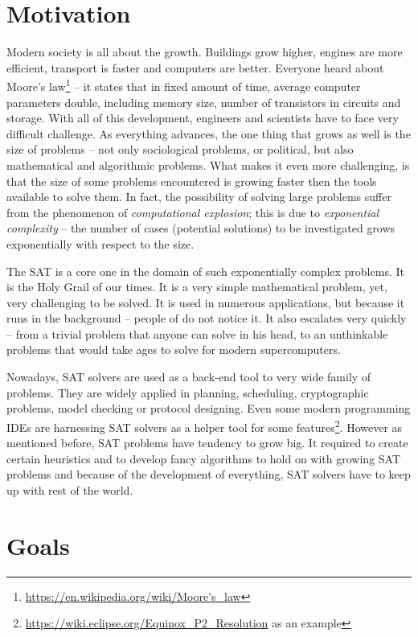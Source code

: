 \documentclass[12pt,english,pdflatex]{aghdpl}
\begin{document}
\section{Motivation}
\label{sec:motivation}

Modern society is all about the growth. Buildings grow higher, engines
are more efficient, transport is faster and computers are better. Everyone
heard about Moore's law\footnote{\url{https://en.wikipedia.org/wiki/Moore's_law}} -- it states that in fixed amount of time,
average computer parameters double, including memory size, number of transistors
in circuits and storage. With all of this development, engineers and
scientists have to face very difficult challenge. As everything advances,
the one thing that grows as well is the size of problems -- not only
sociological problems, or political, but also mathematical and algorithmic
problems. What makes it even more challenging, is that the size of
some problems encountered is growing faster then the tools available to
solve them. In fact, the possibility of solving large problems suffer from the phenomenon of \textit{computational explosion}; this is due to \textit{exponential complexity} -- the number of cases (potential solutions)  to be investigated grows exponentially with respect to the size.

The SAT is a core one in the domain of such exponentially complex problems. It is the Holy Grail of our times.
It is a very simple mathematical problem, yet, very challenging to
be solved. It is used in numerous applications, but because it runs
in the background -- people of do not  notice it. It also escalates very quickly
-- from a trivial problem that anyone can solve in his head, to an
unthinkable problems that would take ages to solve for modern supercomputers.

Nowadays, SAT solvers are used as a back-end tool to very wide family of problems.
They are widely applied in planning, scheduling, cryptographic problems,
model checking or protocol designing. Even some modern programming IDEs are harnessing
SAT solvers as a helper tool for some features\footnote{\url{https://wiki.eclipse.org/Equinox_P2_Resolution} as an example}. However as
mentioned before, SAT problems have tendency to grow big. It required
to create certain heuristics and to develop fancy algorithms to hold
on with growing SAT problems and because of the development of everything,
SAT solvers have to keep up with rest of the world.

\section{Goals}
\label{sec:goals}
\end{document}
